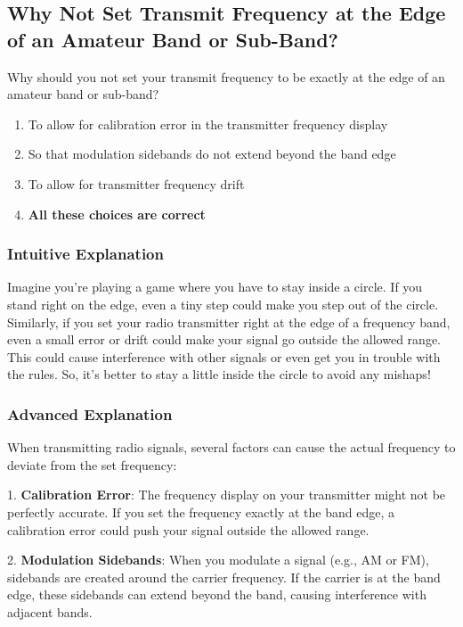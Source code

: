 \subsection{Why Not Set Transmit Frequency at the Edge of an Amateur Band or Sub-Band?}
\label{T1B09}

\begin{tcolorbox}[colback=gray!10!white,colframe=black!75!black,title=T1B09]
Why should you not set your transmit frequency to be exactly at the edge of an amateur band or sub-band?
\begin{enumerate}[label=\Alph*)]
    \item To allow for calibration error in the transmitter frequency display
    \item So that modulation sidebands do not extend beyond the band edge
    \item To allow for transmitter frequency drift
    \item \textbf{All these choices are correct}
\end{enumerate}
\end{tcolorbox}

\subsubsection{Intuitive Explanation}
Imagine you're playing a game where you have to stay inside a circle. If you stand right on the edge, even a tiny step could make you step out of the circle. Similarly, if you set your radio transmitter right at the edge of a frequency band, even a small error or drift could make your signal go outside the allowed range. This could cause interference with other signals or even get you in trouble with the rules. So, it's better to stay a little inside the circle to avoid any mishaps!

\subsubsection{Advanced Explanation}
When transmitting radio signals, several factors can cause the actual frequency to deviate from the set frequency:

1. \textbf{Calibration Error}: The frequency display on your transmitter might not be perfectly accurate. If you set the frequency exactly at the band edge, a calibration error could push your signal outside the allowed range.

2. \textbf{Modulation Sidebands}: When you modulate a signal (e.g., AM or FM), sidebands are created around the carrier frequency. If the carrier is at the band edge, these sidebands can extend beyond the band, causing interference with adjacent bands.


